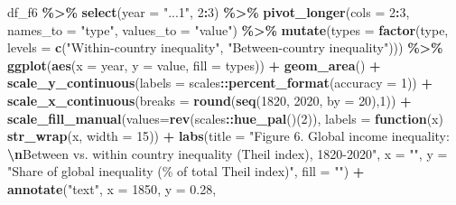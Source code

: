 \documentclass[
  xelatex, ja=standard]{bxjsbook}
\newenvironment{Shaded}{\begin{snugshade}}{\end{snugshade}}
\newcommand{\AttributeTok}[1]{\textcolor[rgb]{0.13,0.29,0.53}{#1}}
\newcommand{\ControlFlowTok}[1]{\textcolor[rgb]{0.13,0.29,0.53}{\textbf{#1}}}
\newcommand{\DecValTok}[1]{\textcolor[rgb]{0.00,0.00,0.81}{#1}}
\newcommand{\FloatTok}[1]{\textcolor[rgb]{0.00,0.00,0.81}{#1}}
\newcommand{\FunctionTok}[1]{\textcolor[rgb]{0.13,0.29,0.53}{\textbf{#1}}}
\newcommand{\NormalTok}[1]{#1}
\newcommand{\SpecialCharTok}[1]{\textcolor[rgb]{0.81,0.36,0.00}{\textbf{#1}}}
\newcommand{\StringTok}[1]{\textcolor[rgb]{0.31,0.60,0.02}{#1}}
\theoremstyle{definition}
\theoremstyle{definition}
\theoremstyle{definition}
\theoremstyle{definition}
\theoremstyle{remark}
\begin{document}
\begin{Shaded}
\begin{Highlighting}[]
\NormalTok{df\_f6 }\SpecialCharTok{\%\textgreater{}\%} \FunctionTok{select}\NormalTok{(}\AttributeTok{year =} \StringTok{"...1"}\NormalTok{, }\DecValTok{2}\SpecialCharTok{:}\DecValTok{3}\NormalTok{) }\SpecialCharTok{\%\textgreater{}\%}
  \FunctionTok{pivot\_longer}\NormalTok{(}\AttributeTok{cols =} \DecValTok{2}\SpecialCharTok{:}\DecValTok{3}\NormalTok{, }\AttributeTok{names\_to =} \StringTok{"type"}\NormalTok{, }\AttributeTok{values\_to =} \StringTok{"value"}\NormalTok{) }\SpecialCharTok{\%\textgreater{}\%}
  \FunctionTok{mutate}\NormalTok{(}\AttributeTok{types =} \FunctionTok{factor}\NormalTok{(type, }
      \AttributeTok{levels =} \FunctionTok{c}\NormalTok{(}\StringTok{"Within{-}country inequality"}\NormalTok{, }\StringTok{"Between{-}country inequality"}\NormalTok{))) }\SpecialCharTok{\%\textgreater{}\%}
  \FunctionTok{ggplot}\NormalTok{(}\FunctionTok{aes}\NormalTok{(}\AttributeTok{x =}\NormalTok{ year, }\AttributeTok{y =}\NormalTok{ value, }\AttributeTok{fill =}\NormalTok{ types)) }\SpecialCharTok{+}
  \FunctionTok{geom\_area}\NormalTok{() }\SpecialCharTok{+}
  \FunctionTok{scale\_y\_continuous}\NormalTok{(}\AttributeTok{labels =}\NormalTok{ scales}\SpecialCharTok{::}\FunctionTok{percent\_format}\NormalTok{(}\AttributeTok{accuracy =} \DecValTok{1}\NormalTok{)) }\SpecialCharTok{+}
  \FunctionTok{scale\_x\_continuous}\NormalTok{(}\AttributeTok{breaks =} \FunctionTok{round}\NormalTok{(}\FunctionTok{seq}\NormalTok{(}\DecValTok{1820}\NormalTok{, }\DecValTok{2020}\NormalTok{, }\AttributeTok{by =} \DecValTok{20}\NormalTok{),}\DecValTok{1}\NormalTok{)) }\SpecialCharTok{+} 
  \FunctionTok{scale\_fill\_manual}\NormalTok{(}\AttributeTok{values=}\FunctionTok{rev}\NormalTok{(scales}\SpecialCharTok{::}\FunctionTok{hue\_pal}\NormalTok{()(}\DecValTok{2}\NormalTok{)), }
      \AttributeTok{labels =} \ControlFlowTok{function}\NormalTok{(x) }\FunctionTok{str\_wrap}\NormalTok{(x, }\AttributeTok{width =} \DecValTok{15}\NormalTok{)) }\SpecialCharTok{+}
  \FunctionTok{labs}\NormalTok{(}\AttributeTok{title =} \StringTok{"Figure 6. Global income inequality: }
\StringTok{       }\SpecialCharTok{\textbackslash{}n}\StringTok{Between vs. within country inequality (Theil index), 1820{-}2020"}\NormalTok{,}
       \AttributeTok{x =} \StringTok{""}\NormalTok{, }\AttributeTok{y =} \StringTok{"Share of global inequality (\% of total Theil index)"}\NormalTok{, }\AttributeTok{fill =} \StringTok{""}\NormalTok{) }\SpecialCharTok{+} 
  \FunctionTok{annotate}\NormalTok{(}\StringTok{"text"}\NormalTok{, }\AttributeTok{x =} \DecValTok{1850}\NormalTok{, }\AttributeTok{y =} \FloatTok{0.28}\NormalTok{, }

\end{Highlighting}
\end{Shaded}
\end{document}
